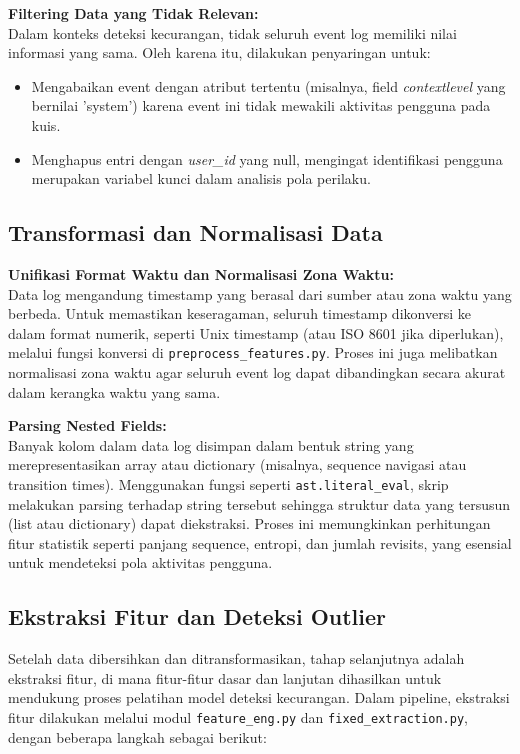 \textbf{Filtering Data yang Tidak Relevan:} \\
Dalam konteks deteksi kecurangan, tidak seluruh event log memiliki nilai informasi yang sama. Oleh karena itu, dilakukan penyaringan untuk:
\begin{itemize}
    \item Mengabaikan event dengan atribut tertentu (misalnya, field \textit{contextlevel} yang bernilai 'system') karena event ini tidak mewakili aktivitas pengguna pada kuis.
    \item Menghapus entri dengan \textit{user\_id} yang null, mengingat identifikasi pengguna merupakan variabel kunci dalam analisis pola perilaku.
\end{itemize}

\subsection{Transformasi dan Normalisasi Data}
\label{sec:transformasiNormalisasiData}
\textbf{Unifikasi Format Waktu dan Normalisasi Zona Waktu:} \\
Data log mengandung timestamp yang berasal dari sumber atau zona waktu yang berbeda. Untuk memastikan keseragaman, seluruh timestamp dikonversi ke dalam format numerik, seperti Unix timestamp (atau ISO 8601 jika diperlukan), melalui fungsi konversi di \texttt{preprocess\_features.py}. Proses ini juga melibatkan normalisasi zona waktu agar seluruh event log dapat dibandingkan secara akurat dalam kerangka waktu yang sama.

\textbf{Parsing Nested Fields:} \\
Banyak kolom dalam data log disimpan dalam bentuk string yang merepresentasikan array atau dictionary (misalnya, sequence navigasi atau transition times). Menggunakan fungsi seperti \texttt{ast.literal\_eval}, skrip melakukan parsing terhadap string tersebut sehingga struktur data yang tersusun (list atau dictionary) dapat diekstraksi. Proses ini memungkinkan perhitungan fitur statistik seperti panjang sequence, entropi, dan jumlah revisits, yang esensial untuk mendeteksi pola aktivitas pengguna.

\subsection{Ekstraksi Fitur dan Deteksi Outlier}
\label{sec:ekstraksiFiturDeteksiOutlier}
Setelah data dibersihkan dan ditransformasikan, tahap selanjutnya adalah ekstraksi fitur, di mana fitur-fitur dasar dan lanjutan dihasilkan untuk mendukung proses pelatihan model deteksi kecurangan. Dalam pipeline, ekstraksi fitur dilakukan melalui modul \texttt{feature\_eng.py} dan \texttt{fixed\_extraction.py}, dengan beberapa langkah sebagai berikut:

